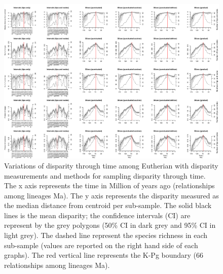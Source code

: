 \begin{landscape}
\begin{figure}[!htbp]
\centering
    \includegraphics[width=\textwidth,height=\textheight,keepaspectratio]{Supplementaries/Figures/STD/Eutheria_all_methods.pdf}
\caption[Comparison of all the disparity metrics and all the time series methods for Eutheria]{Variations of disparity through time among Eutherian with disparity measurements and methods for sampling disparity through time. The x axis represents the time in Million of years ago (relationships among lineages
Ma). The y axis represents the disparity measured as the median distance from centroid per sub-sample. The solid black lines is the mean disparity; the confidence intervals (CI) are represent by the grey polygons (50\% CI in dark grey and 95\% CI in light grey). The dashed line represent the species richness in each sub-sample (values are reported on the right hand side of each graphs). The red vertical line represents the K-Pg boundary (66 relationships among lineages
Ma).}
\label{Supp_disparity_all_Eutheria}
\end{figure}
\end{landscape}



